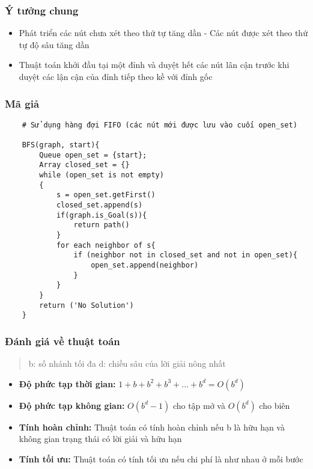 \documentclass{article}
\begin{document}
\subsubsection{Ý tưởng chung}
\begin{itemize}
    \item Phát triển các nút chưa xét theo thứ tự tăng dần - Các nút được xét theo thứ tự độ sâu tăng dần
    \item Thuật toán khởi đầu tại một đỉnh và duyệt hết các nút lân cận trước khi duyệt các lận cận của đỉnh tiếp theo kề với đỉnh gốc
\end{itemize}

\subsubsection{Mã giả}

\begin{verbatim}
    # Sử dụng hàng đợi FIFO (các nút mới được lưu vào cuối open_set)
    
    BFS(graph, start){
        Queue open_set = {start};
        Array closed_set = {}
        while (open_set is not empty)
        {
            s = open_set.getFirst()
            closed_set.append(s)    
            if(graph.is_Goal(s)){
                return path()
            }
            for each neighbor of s{
                if (neighbor not in closed_set and not in open_set){ 
                    open_set.append(neighbor)
                }   
            }
        } 
        return ('No Solution')
    }
\end{verbatim}

\subsubsection{Đánh giá về thuật toán}
\begin{quote}
    b: số nhánh tối đa
    d: chiều sâu của lời giải nông nhất
\end{quote}
\begin{itemize}
    \item \textbf{Độ phức tạp thời gian:} $1 + b + b^2 + b^3 + \dots + b^d = O(b^d)$
    \item \textbf{Độ phức tạp không gian:} $O(b^d-1)$ cho tập mở và $O(b^d)$ cho biên
    \item \textbf{Tính hoàn chỉnh:} Thuật toán có tính hoàn chỉnh nếu b là hữu hạn và không gian trạng thái có lời giải và hữu hạn 
    \item \textbf{Tính tối ưu:} Thuật toán có tính tối ưu nếu chi phí là như nhau ở mỗi bước
\end{itemize}
\end{document}
